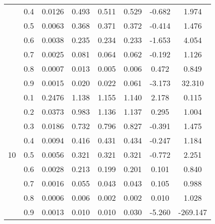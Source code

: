 \documentclass[11pt,a4paper]{report}
\begin{document}
\begin{longtable}{ | c | c || c | c | c | c | c | c | }
 & 0.4 & 0.0126 & 0.493 & 0.511 & 0.529 & -0.682 & 1.974 \\
 & 0.5 & 0.0063 & 0.368 & 0.371 & 0.372 & -0.414 & 1.476 \\
 & 0.6 & 0.0038 & 0.235 & 0.234 & 0.233 & -1.653 & 4.054 \\
 & 0.7 & 0.0025 & 0.081 & 0.064 & 0.062 & -0.192 & 1.126 \\
 & 0.8 & 0.0007 & 0.013 & 0.005 & 0.006 & 0.472 & 0.849 \\
 & 0.9 & 0.0015 & 0.020 & 0.022 & 0.061 & -3.173 & 32.310 \\
 \hline
\multirow{9}{*}{10} & 0.1 & 0.2476 & 1.138 & 1.155 & 1.140 & 2.178 & 0.115 \\
 & 0.2 & 0.0373 & 0.983 & 1.136 & 1.137 & 0.295 & 1.004 \\
 & 0.3 & 0.0186 & 0.732 & 0.796 & 0.827 & -0.391 & 1.475 \\
 & 0.4 & 0.0094 & 0.416 & 0.431 & 0.434 & -0.247 & 1.184 \\
 & 0.5 & 0.0056 & 0.321 & 0.321 & 0.321 & -0.772 & 2.251 \\
 & 0.6 & 0.0028 & 0.213 & 0.199 & 0.201 & 0.101 & 0.840 \\
 & 0.7 & 0.0016 & 0.055 & 0.043 & 0.043 & 0.105 & 0.988 \\
 & 0.8 & 0.0006 & 0.006 & 0.002 & 0.002 & 0.010 & 1.028 \\
 & 0.9 & 0.0013 & 0.010 & 0.010 & 0.030 & -5.260 & -269.147 \\
 \hline
\hline
\end{longtable}
\end{document}
